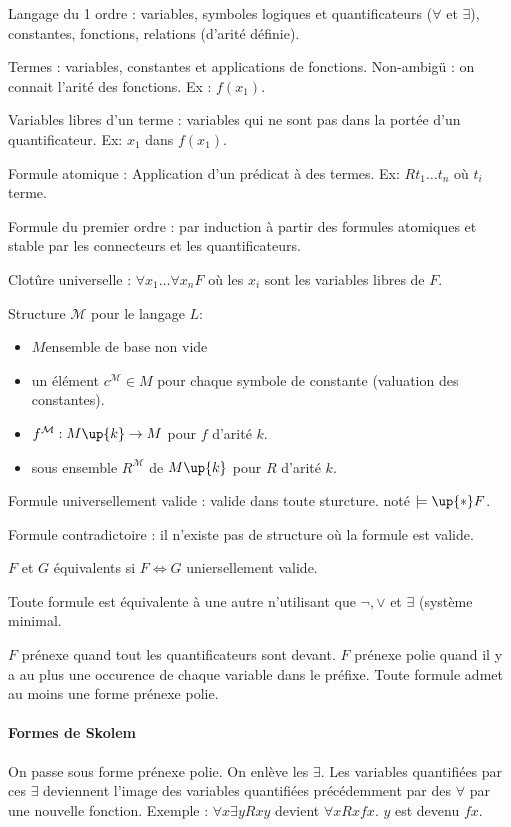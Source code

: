 \documentclass[french]{article}
\begin{document}
Langage du 1 ordre : variables, symboles logiques et quantificateurs ($\forall$ et $\exists$), constantes, fonctions, relations (d'arité définie).

Termes : variables, constantes et applications de fonctions. Non-ambigü : on connait l'arité des fonctions. Ex : $f (x_1)$.

Variables libres d'un terme : variables qui ne sont pas dans la portée d'un quantificateur. Ex: $x_1$ dans $f (x_1)$. 

Formule atomique : Application d'un prédicat à des termes. Ex: $R t_1\dots t_n$ où $t_i$ terme.

Formule du premier ordre : par induction à partir des formules atomiques et stable par les connecteurs et les quantificateurs.

Clotûre universelle : $\forall x_1\dots\forall x_n F$ où les $x_i$ sont les variables libres de $F$.

Structure $\mathcal{M}$ pour le langage $L$:
\begin{itemize}
\item $M$ensemble de base non vide
\item un élément $c^{\mathcal{M}}\in M$ pour chaque symbole de constante (valuation des constantes).
\item $f^{\mathcal{M}}:M\up{k}\rightarrow M$ pour $f$ d'arité $k$.
\item sous ensemble $R^{\mathcal{M}}$ de $M\up{k}$ pour $R$ d'arité $k$.
\end{itemize}


Formule universellement valide : valide dans toute sturcture. noté $\models\up{*} F$.

Formule contradictoire : il n'existe pas de structure où la formule est valide.

$F$ et $G$ équivalents si $F\Leftrightarrow G$ uniersellement valide.

Toute formule est équivalente à une autre n'utilisant que $\neg, \vee$ et $\exists$ (système minimal.


$F$ prénexe quand tout les quantificateurs sont devant. $F$ prénexe polie quand il y a au plus une occurence de chaque variable dans le préfixe. Toute formule admet au moins une forme prénexe polie.

\paragraph{Formes de Skolem}
On passe sous forme prénexe polie. On enlève les $\exists$. Les variables quantifiées par ces $\exists$ deviennent l'image des variables quantifiées précédemment par des $\forall$ par une nouvelle fonction.
Exemple : $\forall x\exists y Rxy$ devient $\forall x Rxfx$. $y$ est devenu $fx$.
\end{document}
